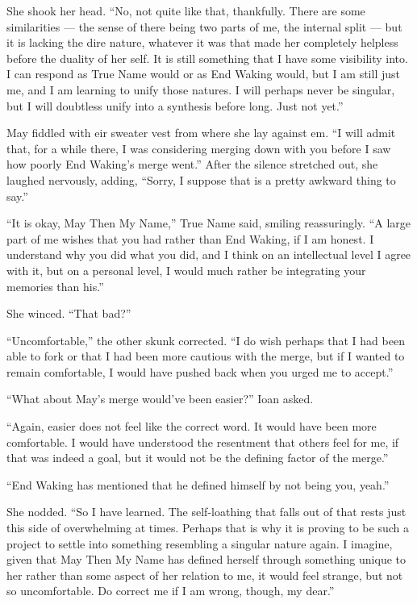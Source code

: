 She shook her head. ``No, not quite like that, thankfully. There are some similarities — the sense of there being two parts of me, the internal split — but it is lacking the dire nature, whatever it was that made her completely helpless before the duality of her self. It is still something that I have some visibility into. I can respond as True Name would or as End Waking would, but I am still just me, and I am learning to unify those natures. I will perhaps never be singular, but I will doubtless unify into a synthesis before long. Just not yet.''

May fiddled with eir sweater vest from where she lay against em. ``I will admit that, for a while there, I was considering merging down with you before I saw how poorly End Waking's merge went.'' After the silence stretched out, she laughed nervously, adding, ``Sorry, I suppose that is a pretty awkward thing to say.''

``It is okay, May Then My Name,'' True Name said, smiling reassuringly. ``A large part of me wishes that you had rather than End Waking, if I am honest. I understand why you did what you did, and I think on an intellectual level I agree with it, but on a personal level, I would much rather be integrating your memories than his.''

She winced. ``That bad?''

``Uncomfortable,'' the other skunk corrected. ``I do wish perhaps that I had been able to fork or that I had been more cautious with the merge, but if I wanted to remain comfortable, I would have pushed back when you urged me to accept.''

``What about May's merge would've been easier?'' Ioan asked.

``Again, easier does not feel like the correct word. It would have been more comfortable. I would have understood the resentment that others feel for me, if that was indeed a goal, but it would not be the defining factor of the merge.''

``End Waking has mentioned that he defined himself by not being you, yeah.''

She nodded. ``So I have learned. The self-loathing that falls out of that rests just this side of overwhelming at times. Perhaps that is why it is proving to be such a project to settle into something resembling a singular nature again. I imagine, given that May Then My Name has defined herself through something unique to her rather than some aspect of her relation to me, it would feel strange, but not so uncomfortable. Do correct me if I am wrong, though, my dear.''

